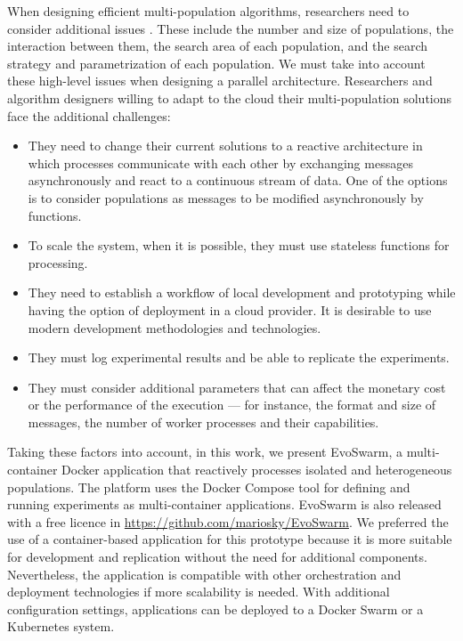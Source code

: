 \documentclass[review]{elsarticle}
\begin{document}
When designing efficient multi-population algorithms, researchers need to
consider additional issues \cite{Ma2019}. These include the number and size of populations,
the interaction between them, the search area of each population, and the search
strategy and parametrization of each population. We must take into account
these high-level issues when designing a parallel architecture. Researchers 
and algorithm designers willing to  adapt to the cloud their
multi-population solutions face the additional challenges:
\begin{itemize}
    \item They need to change their current solutions to a reactive architecture in which processes
    communicate with each other by exchanging messages asynchronously and react
    to a continuous stream of data. One of the options is to consider
    populations as messages to be modified asynchronously by functions. 

    \item To scale the system, when it is possible, they must use stateless functions for
    processing. 

    \item They need to establish a workflow of local development and prototyping while having the 
    option of deployment in a cloud provider. It is desirable to use modern development methodologies and technologies. 

    \item They must log experimental results and be able to replicate the experiments. 

    \item They must consider additional parameters that can affect the monetary cost or the performance of the
    execution — for instance, the format and size of messages, the number of
    worker processes and their capabilities.  
\end{itemize}

Taking these factors into account, in this work, we present EvoSwarm, 
a multi-container Docker application that reactively processes isolated and
heterogeneous populations. The platform uses the Docker Compose tool for
defining and running experiments as multi-container applications. EvoSwarm is also released with a free licence in \url{https://github.com/mariosky/EvoSwarm}.
We preferred the use of a container-based application for this prototype because
it is more suitable for development and replication without the need for
additional components. Nevertheless, the application is compatible with other
orchestration and deployment technologies if more scalability is needed. 
With additional configuration settings, applications can be deployed 
to a Docker Swarm or a Kubernetes system.  
\end{document}
